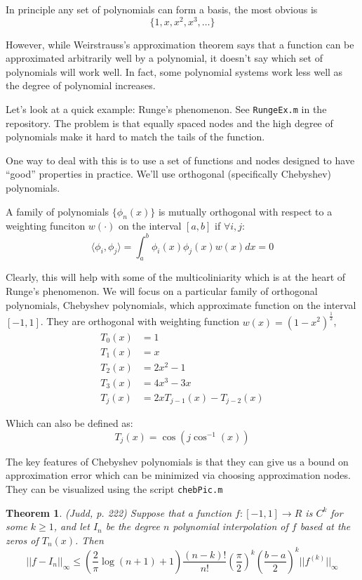 \documentclass[twoside]{article}
\newcounter{lecnum}
\newtheorem{theorem}{Theorem}[lecnum]
\begin{document}
In principle any set of polynomials can form a basis, the most obvious is
$$ \{1, x, x^2, x^3, \ldots \}$$

However, while Weirstrauss's approximation theorem says that a function can be approximated arbitrarily well by a polynomial, it doesn't say which 
set of polynomials will work well. In fact, some polynomial systems work less well as the degree of polynomial increases. 

Let's look at a quick example: Runge's phenomenon.  See {\tt RungeEx.m} in the repository.   The problem is that equally spaced nodes and the high degree of polynomials make it hard to match the tails of the function. 

One way to deal with this is to use a set of functions and nodes designed to have ``good'' properties in practice. We'll use orthogonal (specifically Chebyshev) polynomials. 

A family of polynomials $\{\phi_n(x)\}$ is mutually orthogonal with respect to a weighting funciton $w(\cdot)$ on the interval $[a,b]$ if $\forall i, j:$
$$ \langle \phi_i, \phi_j \rangle = \int_a^b \phi_i(x) \phi_j(x) w(x) dx = 0 $$

Clearly, this will help with some of the multicoliniarity which is at the heart of Runge's phenomenon. We will focus on a particular family of 
orthogonal polynomials, Chebyshev polynomials, which approximate function on the interval $[-1, 1]$. They are orthogonal with weighting function $w(x) = (1-x^2)^{\frac{1}{2}}$, 
\begin{align*}
T_0(x) &= 1 \\
T_1(x) &= x \\
T_2(x) &= 2x^2-1 \\
T_3(x) &= 4x^3 - 3x \\
T_j(x)  &= 2xT_{j-1}(x) - T_{j-2}(x) 
\end{align*}

Which can also be defined as: 
$$ T_j(x) = \cos(j \cos^{-1}(x)) $$

The key features of Chebyshev polynomials is that they can give us a bound on approximation error which can be minimized via choosing approximation nodes. They can be visualized using the script  {\tt chebPic.m}

\begin{theorem}
(Judd, p. 222) Suppose that a function $f: [-1, 1] \rightarrow R$ is $C^k$ for some $k \geq 1$, and let $I_n$ be the degree $n$ polynomial interpolation of $f$ based at the zeros of $T_n(x)$. Then
$$||f - I_n||_\infty \leq \left( \frac{2}{\pi} \log(n+1) + 1\right) \frac{(n-k)!}{n!} \left( \frac{\pi}{2} \right)^k \left( \frac{b-a}{2} \right)^k ||f^{(k)}||_\infty $$
\end{theorem}
\end{document}
